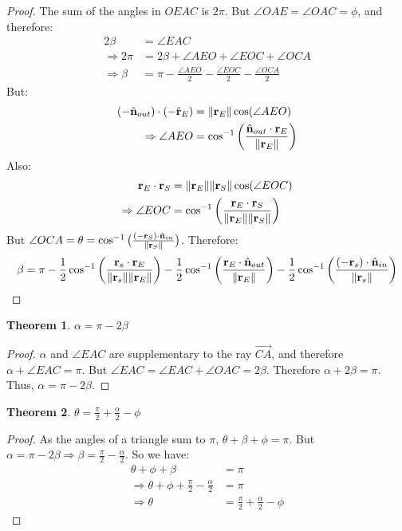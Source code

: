 \documentclass[oneside]{book}
\theoremstyle{mystyle}
\newtheorem{theorem}{Theorem}[section]
\DeclarePairedDelimiter\norm{\lVert}{\rVert}
\begin{document}
\begin{proof}
The sum of the angles in $OEAC$ is $2\pi$. But $\angle OAE = \angle OAC = \phi$, and therefore:
\begin{align*}
    2\beta &=\angle EAC \\
    \Rightarrow 2\pi &= 2\beta + \angle AEO + \angle EOC + \angle OCA\\
    \Rightarrow \beta &= \pi - \frac{\angle AEO}{2}-\frac{\angle EOC}{2}-\frac{\angle OCA}{2}
\end{align*}
But:
\begin{align*}
(-\hat{\mathbf{n}}_{out})\cdot (-\hat{\mathbf{r}}_{E}) &= \norm{\mathbf{r}_{E}}\cos(\angle AEO)\\
\Rightarrow \angle AEO &= \cos^{-1}\bigg(\frac{\hat{\mathbf{n}}_{out}\cdot \mathbf{r}_{E}}{\norm{\mathbf{r}_{E}}}\bigg)
\end{align*}
Also:
\begin{align*}
    \mathbf{r}_{E}\cdot \mathbf{r}_{S} &= \norm{\mathbf{r}_{E}}\norm{\mathbf{r}_{S}}\cos(\angle EOC)\\
    \Rightarrow \angle EOC &= \cos^{-1}\bigg(\frac{\mathbf{r}_{E}\cdot \mathbf{r}_{S}}{\norm{\mathbf{r}_{E}}\norm{\mathbf{r}_{S}}}\bigg)
\end{align*}
But $\angle OCA = \theta = \cos^{-1}\big(\frac{(-\mathbf{r}_{S})\cdot \hat{\mathbf{n}}_{in}}{\norm{\mathbf{r}_{S}}}\big)$. Therefore:
\begin{equation*}
\beta = \pi - \frac{1}{2}\cos^{-1}\bigg(\frac{\mathbf{r}_{s}\cdot \mathbf{r}_{E}}{\norm{\mathbf{r}_{s}}\norm{\mathbf{r}_{E}}}\bigg) - \frac{1}{2}\cos^{-1}\bigg(\frac{\mathbf{r}_{E}\cdot \hat{\mathbf{n}}_{out}}{\norm{\mathbf{r}_{E}}}\bigg) - \frac{1}{2}\cos^{-1}\bigg(\frac{(-\mathbf{r}_{s})\cdot \hat{\mathbf{n}}_{in}}{\norm{\mathbf{r}_{s}}}\bigg)
\end{equation*}
\end{proof}
\begin{theorem}
$\alpha = \pi - 2\beta$
\end{theorem}
\begin{proof}
$\alpha$ and $\angle EAC$ are supplementary to the ray $\overrightarrow{CA}$, and therefore $\alpha + \angle EAC = \pi$. But $\angle EAC = \angle EAC + \angle OAC = 2\beta$. Therefore $\alpha + 2\beta = \pi$. Thus, $\alpha = \pi - 2\beta$.
\end{proof}
\begin{theorem}
$\theta = \frac{\pi}{2}+ \frac{\alpha}{2}-\phi$
\end{theorem}
\begin{proof}
As the angles of a triangle sum to $\pi$, $\theta+\beta+\phi = \pi$. But $\alpha = \pi - 2\beta \Rightarrow \beta = \frac{\pi}{2}-\frac{\alpha}{2}$. So we have:
\begin{align*}
    \theta+\phi+\beta &=\pi \\
    \Rightarrow \theta+\phi+\frac{\pi}{2}-\frac{\alpha}{2} &= \pi\\
    \Rightarrow \theta &= \frac{\pi}{2} +\frac{\alpha}{2}-\phi
\end{align*}
\end{proof}
\end{document}
